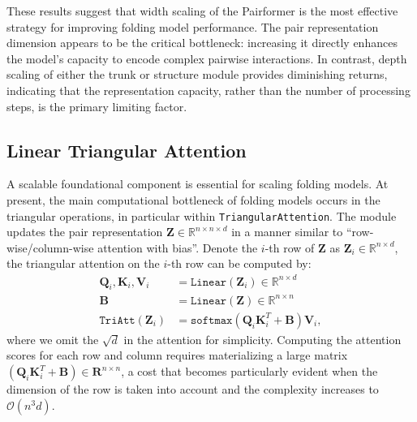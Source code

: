 \documentclass[]{bytedance_seed}
\begin{document}
These results suggest that width scaling of the Pairformer is the most effective strategy for improving folding model performance. The pair representation dimension appears to be the critical bottleneck: increasing it directly enhances the model's capacity to encode complex pairwise interactions. In contrast, depth scaling of either the trunk or structure module provides diminishing returns, indicating that the representation capacity, rather than the number of processing steps, is the primary limiting factor.















\subsection{Linear Triangular Attention}
\label{sec:linear_att}

A scalable foundational component is essential for scaling folding models. At present, the main computational bottleneck of folding models occurs in the triangular operations, in particular within \texttt{TriangularAttention}. The module updates the pair representation $\mathbf{Z} \in \mathbb{R}^{n\times n \times d}$ in a manner similar to ``row-wise/column-wise attention with bias''. Denote the $i$-th row of $\mathbf{Z}$ as $\mathbf{Z}_i \in \mathbb{R}^{n\times d}$, the triangular attention on the $i$-th row can be computed by:
\begin{align}
\mathbf{Q}_i, \mathbf{K}_i, \mathbf{V}_i & = \mathtt{Linear}(\mathbf{Z}_i) \in \mathbb{R}^{n\times d} \\
\mathbf{B} & = \mathtt{Linear}(\mathbf{Z}) \in \mathbb{R}^{n\times n} \\
\mathtt{TriAtt}(\mathbf{Z}_i) & = \mathtt{softmax}\left(\mathbf{Q}_i\mathbf{K}_i^T+\mathbf{B}\right)\mathbf{V}_i,
\end{align}
where we omit the $\sqrt{d}$ in the attention for simplicity. Computing the attention scores for each row and column requires materializing a large matrix $(\mathbf{Q}_i\mathbf{K}_i^T+\mathbf{B}) \in \mathbf{R}^{n\times n}$, a cost that becomes particularly evident when the dimension of the row is taken into account and the complexity increases to  $\mathcal{O}(n^3d)$. 
\end{document}
